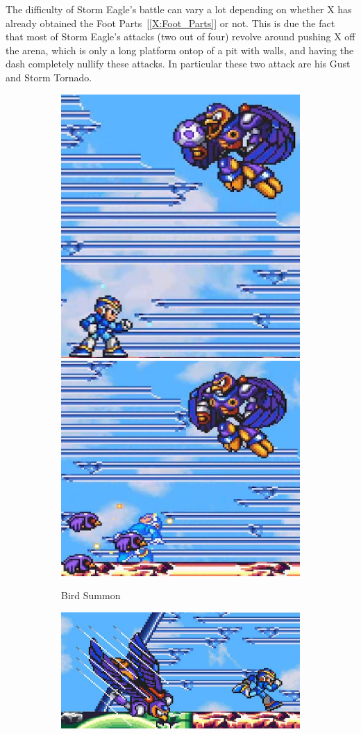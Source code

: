  The difficulty of Storm Eagle's battle can vary a lot depending on whether X has already obtained the Foot Parts~[\ref{X:Foot_Parts}] or not. This is due the fact that most of Storm Eagle's attacks (two out of four) revolve around pushing X off the arena, which is only a long platform ontop of a pit with walls, and having the dash completely nullify these attacks. In particular these two attack are his Gust~\cite{wiki:Storm_eagle} and Storm Tornado.
 \begin{figure}[htp]
 	\centering
 	\begin{subfigure}{\linewidth}
 		\centering
 		\includegraphics[width=0.25\linewidth]{figures/X1/Storm_eagle/Eagle_egg_1.jpg}
 		\includegraphics[width=0.3\linewidth]{figures/X1/Storm_eagle/Eagle_egg_2.jpg}
 		\caption{Bird Summon}
 	\end{subfigure}
	\begin{subfigure}{0.35\linewidth}
	 	\centering
	 	\includegraphics[width=\linewidth]{figures/X1/Storm_eagle/Eagle_dive.jpg}

\end{subfigure}
\end{figure}
